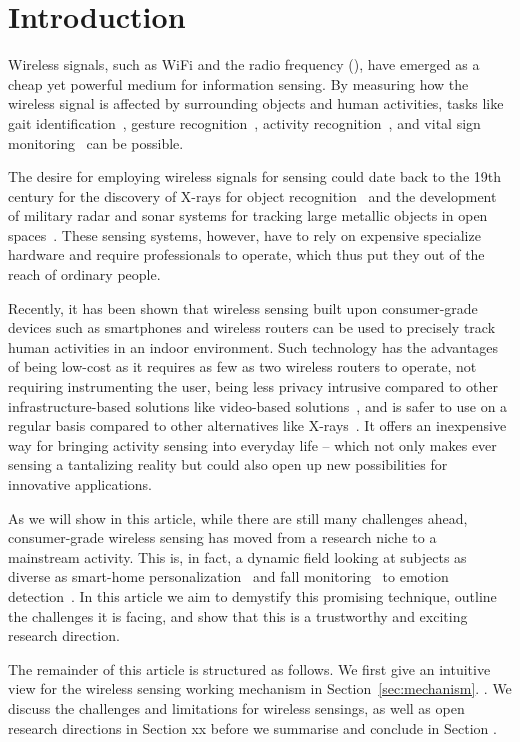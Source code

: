 \section{Introduction}
Wireless signals, such as WiFi and the radio frequency (\RF), have emerged as a cheap yet powerful medium for information sensing. By
measuring how the wireless signal is affected by surrounding objects and human activities, tasks like gait identification~\cite{}, gesture
recognition~\cite{}, activity recognition~\cite{}, and vital sign monitoring~\cite{} can be possible.


The desire for employing wireless signals for sensing could date back to the 19th century  for the discovery of X-rays for object
recognition~\cite{} and the development of military radar and sonar systems for tracking large metallic objects in open
spaces~\cite{Charles Samuel Franklin 's development of first practcial radar}. These sensing systems, however, have to rely on expensive
specialize hardware and require professionals to operate, which thus put they out of the reach of ordinary people.



Recently, it has been shown that wireless sensing built upon consumer-grade devices such as smartphones and wireless routers can be used to
precisely track human activities in an indoor environment. Such technology has the advantages of being low-cost as it requires as few as
two wireless routers to operate, not requiring instrumenting the user, being less privacy intrusive compared to other infrastructure-based
solutions like video-based solutions~\cite{}, and is safer to use on a regular basis compared to other alternatives like X-rays~\cite{}. It
offers an inexpensive way for bringing activity sensing into everyday life -- which not only makes ever sensing a tantalizing reality but
could also open up new possibilities for innovative applications.


As we will show in this article, while there are still many challenges ahead, consumer-grade wireless sensing has moved from a research
niche to a mainstream activity. This is, in fact, a dynamic field looking at subjects as diverse as smart-home personalization~\cite{} and
fall monitoring~\cite{} to emotion detection~\cite{}. In this article we aim to demystify this promising technique, outline the challenges
it is facing, and show that this is a trustworthy and exciting research direction.




The remainder of this article is structured as follows. We first give an intuitive view for the wireless sensing working mechanism  in
Section~\ref{sec:mechanism}. . We discuss the challenges and limitations for wireless sensings, as
well as open research directions in Section xx before we summarise and conclude in Section .


